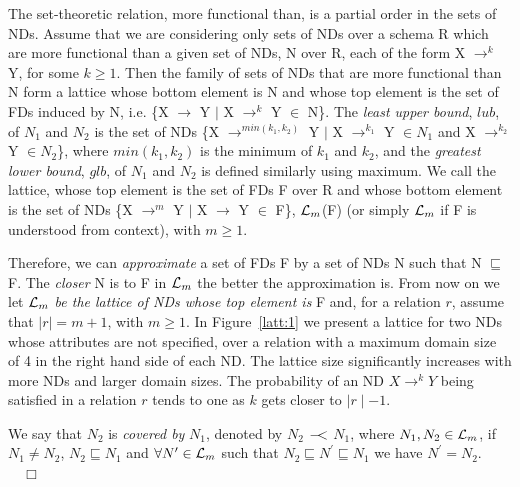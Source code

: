 The set-theoretic relation, more functional than, 
is a partial order in the sets of NDs.
Assume that we are considering only sets of NDs over a schema R which
are more functional  
than a given set of NDs, N over R, each of the form X $\to^k$ Y, 
for some $k \ge 1$.
Then the family of sets of NDs that are more functional than N form a lattice
whose bottom element is N and whose top element is the set of FDs
induced by N, i.e. \{X $\to$ Y $\mid$ X $\to^k$ Y $\in$ N\}.
The {\em least upper bound}, $lub$, of $N_1$ and $N_2$ is the set of NDs
\{X $\to^{min(k_1, k_2)}$ Y $\mid$
X $\to^{k_1}$ Y $\in N_1$ and X $\to^{k_2}$ Y $\in N_2$\},
where $min(k_1, k_2)$ is the minimum of $k_1$ and $k_2$, and the 
{\em greatest lower bound}, $glb$, of $N_1$ and $N_2$ is defined similarly using maximum.
We call the lattice, whose top element is the set of FDs F over R
and whose bottom element is the set of NDs
\{X $\to^m$ Y $\mid$ X $\to$ Y $\in$ F\}, ${\cal L}_m$(F)
(or simply ${\cal L}_m$ if F is understood from context), with $m \ge 1$.


Therefore, we can {\em approximate} a set of FDs F by a set of NDs N
such that N $\sqsubseteq$ F. 
The {\em closer} N is to F in ${\cal L}_m$ the better the approximation is.
From now on we let ${\cal L}_m$ 
{\em be the lattice of NDs whose top element is} F
and, for a relation $r$, assume that $\mid r \mid = m+1$, with $m \ge 1$. In
Figure~\ref{latt:1} we present a lattice for two NDs whose attributes
are not specified, over a relation with a maximum domain size of 4 in
the right hand side of each ND. The lattice size significantly increases
with more NDs and larger domain sizes.
The probability of
an ND $X \to^k Y$ being satisfied in a relation $r$ tends to one as
$k$ gets closer to $\mid r \mid - 1$. 
\begin{definition}[Covered By]\label{def:covered}
\begin{rm}
We say that $N_2$ is {\em covered by} $N_1$, denoted by $N_2$ $-\!\!\!<$
$N_1$, where $N_1, N_2 \in {\cal L}_m$, 
if $N_1 \not= N_2$, $N_2 \sqsubseteq N_1$ and
$\forall N^\prime \in {\cal L}_m$ such that 
$N_2 \sqsubseteq N^\prime \sqsubseteq N_1$ we have $N^\prime =
N_2$. $\quad\Box$ 
\end{rm}
\end{definition}

